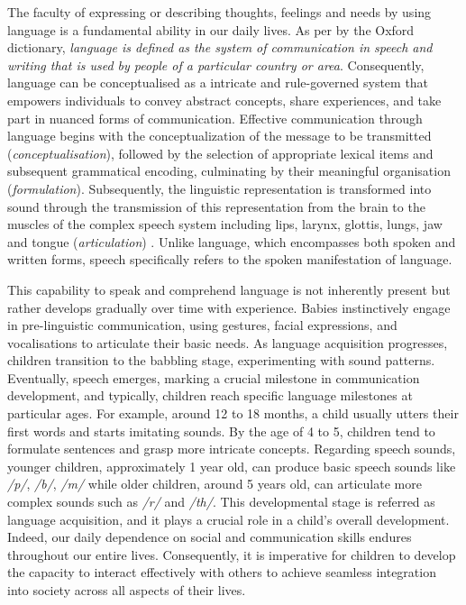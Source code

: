\cleardoublepage
\label{chapter:1}
The faculty of expressing or describing thoughts, feelings and needs by using language is a fundamental ability in our daily lives. As per by the Oxford dictionary,  \textit{language is defined as the system of communication in speech and writing that is used by people of a particular country or area}. Consequently, language can be conceptualised as a intricate and rule-governed system that empowers individuals to convey abstract concepts, share experiences, and take part in nuanced forms of communication. Effective communication through language begins with the conceptualization of the message to be transmitted (\textit{conceptualisation}), followed by the selection of appropriate lexical items and subsequent grammatical encoding, culminating by their meaningful organisation (\textit{formulation}). Subsequently, the linguistic representation is transformed into sound through the transmission of this representation from the brain to the muscles of the complex speech system including lips, larynx, glottis, lungs, jaw and tongue (\textit{articulation}) \cite{levelt1993speaking}. Unlike language, which encompasses both spoken and written forms, speech specifically refers to the spoken manifestation of language.

This capability to speak and comprehend language is not inherently present but rather develops gradually over time with experience. Babies  instinctively engage in pre-linguistic communication, using gestures, facial expressions, and vocalisations to articulate their basic needs. As language acquisition progresses, children transition to the babbling stage, experimenting with sound patterns. Eventually, speech emerges, marking a crucial milestone in communication development, and typically, children reach specific language milestones at particular ages. For example, around 12 to 18 months, a child usually utters their first words and starts imitating sounds. By the age of 4 to 5, children tend to formulate sentences and grasp more intricate concepts. Regarding speech sounds, younger children, approximately 1 year old, can produce basic speech sounds like \textit{/p/}, \textit{/b/}, \textit{/m/} while older children, around 5 years old, can articulate more complex sounds such as \textit{/r/} and \textit{/th/}. This developmental stage is referred as language acquisition, and it plays a crucial role in a child's overall development. Indeed, our daily dependence on social and communication skills endures throughout our entire lives. Consequently, it is imperative for children to develop the capacity to interact effectively with others to achieve seamless integration into society across all aspects of their lives.

